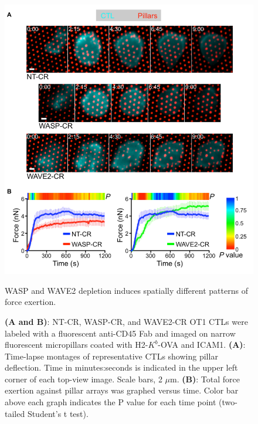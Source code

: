 \begin{figure}[htbp]
	\centering
	\includegraphics[width=\textwidth]{../figures/chapter2/fig6pillars.png}
	\caption{WASP and WAVE2 depletion induces spatially different patterns of force exertion.}
	\caption*{\textbf{(A and B)}: NT-CR, WASP-CR, and WAVE2-CR OT1 CTLs were labeled with a fluorescent anti-CD45 Fab and imaged on narrow fluorescent micropillars coated with H2-$K^{b}$-OVA and ICAM1. \textbf{(A)}: Time-lapse montages of representative CTLs showing pillar deflection. Time in minutes:seconds is indicated in the upper left corner of each top-view image. Scale bars, 2 $\mu$m. \textbf{(B)}: Total force exertion against pillar arrays was graphed versus time. Color bar above each graph indicates the P value for each time point (two-tailed Student’s t test).}
	\label{fig:fig6pillars}
\end{figure}

